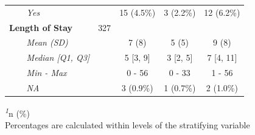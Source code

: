 \documentclass[
]{article}
\begin{document}
\begin{table}[t]
\begin{tabular*}{0.7\linewidth}{@{\extracolsep{\fill}}lcccc}
{\itshape     Yes} &  & 15 (4.5\%) & 3 (2.2\%) & 12 (6.2\%) \\ 
{\bfseries Length of Stay} & 327 &  &  &  \\ 
{\itshape     Mean (SD)} &  & 7 (8) & 5 (5) & 9 (8) \\ 
{\itshape     Median {[}Q1, Q3{]}} &  & 5 {[}3, 9{]} & 3 {[}2, 5{]} & 7 {[}4, 11{]} \\ 
{\itshape     Min - Max} &  & 0 - 56 & 0 - 33 & 1 - 56 \\ 
{\itshape     NA} &  & 3 (0.9\%) & 1 (0.7\%) & 2 (1.0\%) \\ 
\bottomrule
\end{tabular*}
\begin{minipage}{\linewidth}
\textsuperscript{\textit{1}}n (\%)\\
Percentages are calculated within levels of the stratifying 
    variable\\
\end{minipage}
\end{table}
\end{document}
